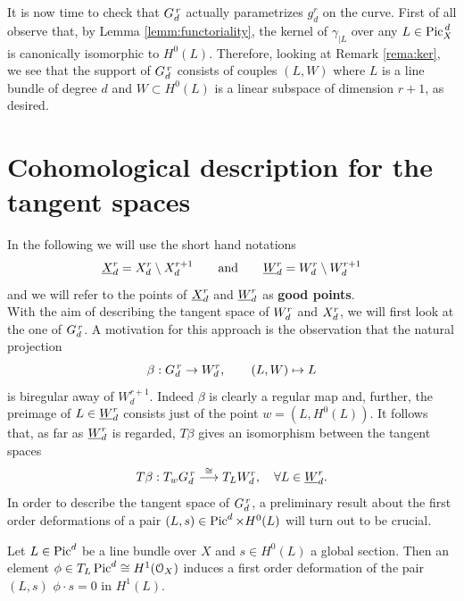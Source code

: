 	It is now time to check that $G_d^{\,r}$ actually parametrizes $g_d^r$ on the curve. 
	First of all observe that, by Lemma \ref{lemm:functoriality}, the kernel of $\gamma_{\mid L}$ over any $L \in \operatorname{Pic}^{\,d}_X$ is canonically isomorphic to $H^0(L)$. 
	Therefore, looking at Remark \ref{rema:ker}, we see that the support of $G_d^{\,r}$ consists of couples $(L, W)$ where $L$ is a line bundle of degree $d$ and $W\subset H^0(L)$ is a linear subspace of dimension $r+1$, as desired.


\section{Cohomological description for the tangent spaces}

	In the following we will use the short hand notations
	$$ \underline{X}_d^{r} = X_d^r\setminus X_d^{r+1} \qquad \text{and} \qquad \underline{W}_d^{r} = W_d^r\setminus W_d^{r+1} $$
	and we will refer to the points of $\underline{X}_d^{r}$ and $\underline{W}_d^{r}$ as \textbf{good points}.\\
	With the aim of describing the tangent space of $W_d^r$ and $X_d^r$, we will first look at the one of $G_d^{\,r}$. A motivation for this approach is the observation that the natural projection
	$$ \beta:G_d^{\,r}\to W_d^r, \qquad (L,W) \mapsto L $$
	is biregular away of $W_d^{r+1}$. Indeed $\beta$ is clearly a regular map and, further, the preimage of $L\in \underline{W}_d^{r}$ consists just of the point $w=(L,H^0(L))$. It follows that, as far as $\underline{W}_d^{r}$ is regarded, $T\beta$ gives an isomorphism between the tangent spaces
	\begin{equation}\label{eq:tgnt_Wdrr}
		T\beta : T_{w}G_d^{\,r} \overset{\cong}\longrightarrow T_LW_d^r, \quad \forall L\in\underline{W}_d^{r}.
	\end{equation}
	In order to describe the tangent space of $G_d^{\,r}$, a preliminary result about the first order deformations of a pair $(L,s) \in \operatorname{Pic}^d \times H^0(L)$ will turn out to be crucial.
	\begin{prop}\label{prop:cohom_condition}
		Let $L\in \operatorname{Pic}^d$ be a line bundle over $X$ and $s\in H^0(L)$ a global section. Then an element $\phi \in T_L\operatorname{Pic}^d \cong H^1(\mathcal{O}_X)$ induces a first order deformation of the pair $(L,s)$ \ABiff $\phi\cdot s=0$ in $H^1(L)$.
	\end{prop}
